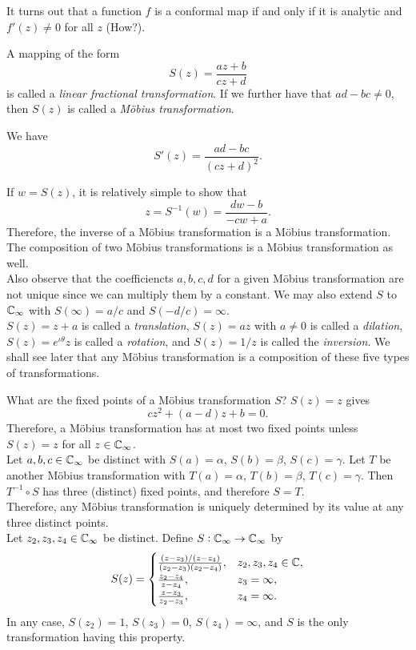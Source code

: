 	It turns out that a function $f$ is a conformal map if and only if it is analytic and $f'(z) \ne 0$ for all $z$ (How?).

	\begin{fdef}
		A mapping of the form
		\[ S(z) = \frac{az+b}{cz+d} \]
		is called a \emph{linear fractional transformation}. If we further have that $ad-bc \ne 0$, then $S(z)$ is called a \emph{M\"{o}bius transformation}.
	\end{fdef}

	We have
	\[ S'(z) = \frac{ad-bc}{(cz+d)^2}. \]

	If $w = S(z)$, it is relatively simple to show that
	\[ z = S^{-1}(w) = \frac{dw-b}{-cw+a}. \]
	Therefore, the inverse of a M\"{o}bius transformation is a M\"{o}bius transformation. The composition of two M\"{o}bius transformations is a M\"{o}bius transformation as well.\\
	Also observe that the coefficiencts $a,b,c,d$ for a given M\"{o}bius transformation are not unique since we can multiply them by a constant. We may also extend $S$ to $\mathbb{C}_\infty$ with $S(\infty) = a/c$ and $S(-d/c) = \infty$.\\

	$S(z) = z+a$ is called a \emph{translation}, $S(z) = az$ with $a\ne 0$ is called a \emph{dilation}, $S(z) = e^{\iota\theta} z$ is called a \emph{rotation}, and $S(z) = 1/z$ is called the \emph{inversion}. We shall see later that any M\"{o}bius transformation is a composition of these five types of transformations.

	What are the fixed points of a M\"{o}bius transformation $S$? $S(z) = z$ gives
	\[ cz^2 + (a-d)z + b = 0. \]
	Therefore, a M\"{o}bius transformation has at most two fixed points unless $S(z) = z$ for all $z \in \mathbb{C}_\infty$.\\

	Let $a,b,c\in\mathbb{C}_\infty$ be distinct with $S(a) = \alpha$, $S(b) = \beta$, $S(c) = \gamma$. Let $T$ be another M\"{o}bius transformation with $T(a) = \alpha$, $T(b) = \beta$, $T(c) = \gamma$. Then $T^{-1} \circ S$ has three (distinct) fixed points, and therefore $S = T$.\\
	Therefore, any M\"{o}bius transformation is uniquely determined by its value at any three distinct points.\\

	Let $z_2,z_3,z_4 \in \mathbb{C}_\infty$ be distinct. Define $S:\mathbb{C}_\infty\to\mathbb{C}_\infty$ by
	\[
	S(z) =
	\begin{cases}
		\frac{(z-z_3)/(z-z_4)}{(z_2-z_3)(z_2-z_4)}, & z_2,z_3,z_4 \in \mathbb{C}, \\
		\frac{z_2-z_4}{z-z_4}, & z_3 = \infty, \\
		\frac{z-z_3}{z_2-z_3}, & z_4 = \infty. \\
	\end{cases}
	\]
	In any case, $S(z_2) = 1$, $S(z_3) = 0$, $S(z_4) = \infty$, and $S$ is the only transformation having this property.

